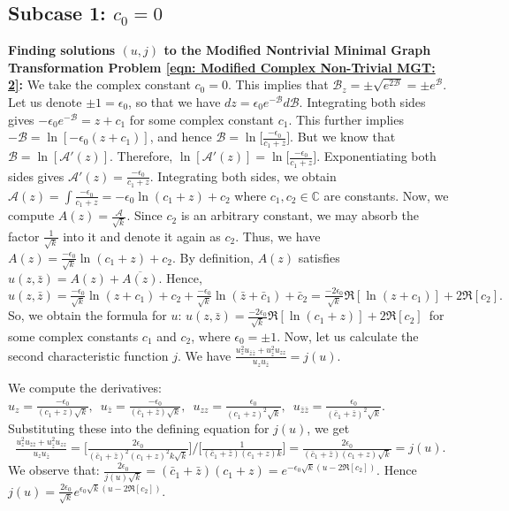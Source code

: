 \documentclass[12pt]{article}
\theoremstyle{plain}
\theoremstyle{definition}
\theoremstyle{remark}
\begin{document}
\subsection{Subcase 1: $c_0=0$}
\textbf{Finding solutions \((u,j)\) to the Modified Nontrivial Minimal Graph Transformation Problem \ref{eqn: Modified Complex Non-Trivial MGT: 2}:} We take the complex constant \(c_0 = 0\). This implies that \(\mathcal{B}_z = \pm \sqrt{e^{2\mathcal{B}}} = \pm e^{\mathcal{B}}\). Let us denote \(\pm 1 = \epsilon_0\), so that we have \(dz = \epsilon_0 e^{-\mathcal{B}} d\mathcal{B}\). Integrating both sides gives \(-\epsilon_0 e^{-\mathcal{B}} = z + c_1\) for some complex constant \(c_1\). This further implies 
\(-\mathcal{B} = \ln[-\epsilon_0(z + c_1)]\), and hence \(\mathcal{B}=\ln\big[\tfrac{-\epsilon_0}{c_1 + z}\big]\). But we know that \(\mathcal{B} = \ln[\mathcal{A}'(z)]\). Therefore, \(\ln[\mathcal{A}'(z)]=\ln\big[\tfrac{-\epsilon_0}{c_1 + z}\big]\).
Exponentiating both sides gives \(\mathcal{A}'(z)=\tfrac{-\epsilon_0}{c_1 + z}\). Integrating both sides, we obtain \(\mathcal{A}(z)=\int\frac{-\epsilon_0}{c_1 + z}=-\epsilon_0\ln(c_1 + z)+c_2\) where \(c_1, c_2 \in \mathbb{C}\) are constants. Now, we compute \(A(z) = \frac{\mathcal{A}}{\sqrt{k}}\). Since \(c_2\) is an arbitrary constant, we may absorb the factor \(\frac{1}{\sqrt{k}}\) into it and denote it again as \(c_2\). Thus, we have \(A(z)= \frac{-\epsilon_0}{\sqrt{k}}\ln(c_1 + z)+c_2\). By definition, \(A(z)\) satisfies \(u(z, \bar{z}) = A(z) + \overline{A(z)}\). Hence,
\[
 u(z, \bar{z}) = \tfrac{-\epsilon_0}{\sqrt{k}} \ln(z + c_1) + c_2 + \tfrac{-\epsilon_0}{\sqrt{k}} \ln(\bar{z} + \bar{c}_1) + \bar{c}_2 = \tfrac{-2\epsilon_0}{\sqrt{k}} \Re[\ln(z + c_1)] + 2\Re[c_2].
\]
So, we obtain the formula for \(u\): \(\boxed{u(z,\bar z) = \tfrac{-2\epsilon_0}{\sqrt{k}} \Re[\ln(c_1 + z)] + 2\Re[c_2]}\,\) for some complex constants \(c_1\) and \(c_2\), where \(\epsilon_0 = \pm 1\). Now, let us calculate the second characteristic function \(j\). We have \(\frac{u_z^2u_{\bar z\bar z}+u_{\bar z}^2u_{zz}}{u_z u_{\bar z}} = j(u).\)

We compute the derivatives: \(u_z = \tfrac{-\epsilon_0}{(c_1 + z)\sqrt{k}}, \,\,\, u_{\bar z} = \tfrac{-\epsilon_0}{(\bar c_1 + \bar z)\sqrt{k}}, \,\,\, u_{zz} = \tfrac{\epsilon_0}{(c_1 + z)^2\sqrt{k}}, \,\,\, u_{\bar z\bar z} = \tfrac{\epsilon_0}{(\bar c_1 + \bar z)^2\sqrt{k}}\). Substituting these into the defining equation for \(j(u)\), we get
\[
\tfrac{u_z^2u_{\bar z\bar z}+u_{\bar z}^2u_{zz}}{u_z u_{\bar z}} = \big[\tfrac{2\epsilon_0}{(\bar c_1 + \bar z)^2 (c_1 + z)^2 k \sqrt{k}}\big]/\big[\tfrac{1}{(\bar c_1 + \bar z)(c_1 + z) k}\big]= \tfrac{2\epsilon_0}{(\bar c_1 + \bar z)(c_1 + z)\sqrt{k}} = j(u).
\]
We observe that: \(\tfrac{2\epsilon_0}{j(u)\sqrt{k}} = (\bar c_1 + \bar z)(c_1 + z)
= e^{-\epsilon_0 \sqrt{k}(u - 2\Re[c_2])}.\) Hence \(\boxed{j(u) = \tfrac{2\epsilon_0}{\sqrt{k}} e^{\epsilon_0 \sqrt{k} (u - 2\Re[c_2])}}.\)
\end{document}
